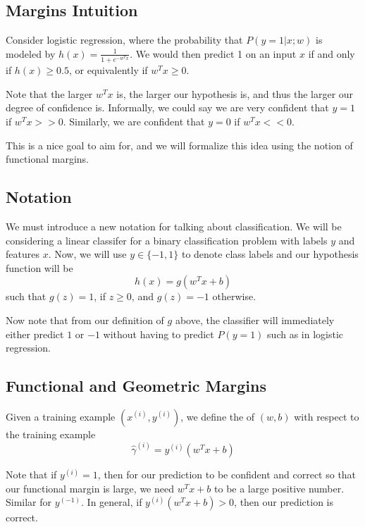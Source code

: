 \documentclass[12pt]{scrartcl}
\begin{document}
\subsection{Margins Intuition}

Consider logistic regression, where the probability that $P(y = 1 | x; w)$ is modeled by $h(x) = \frac{1}{1 + e^{-w^Tx}}$. We would then predict 1 on an input $x$ if and only if $h(x) \geq 0.5$, or equivalently if $w^Tx \geq 0$.

\begin{note}
    Note that the larger $w^Tx$ is, the larger our hypothesis is, and thus the larger our degree of confidence is. Informally, we could say we are very confident that $y = 1$ if $w^Tx >> 0$. Similarly, we are confident that $y = 0$ if $w^Tx << 0$.
\end{note}

This is a nice goal to aim for, and we will formalize this idea using the notion of functional margins.

\subsection{Notation}

We must introduce a new notation for talking about classification. We will be considering a linear classifer for a binary classification problem with labels $y$ and features $x$. Now, we will use $y \in \{-1, 1\}$ to denote class labels and our hypothesis function will be 
\[h(x) = g(w^Tx + b)\]
such that $g(z) = 1$, if $z \geq 0$, and $g(z) = -1$ otherwise.
\begin{note}
    Now note that from our definition of $g$ above, the classifier will immediately either predict $1$ or $-1$ without having to predict $P(y = 1)$ such as in logistic regression.
\end{note}

\subsection{Functional and Geometric Margins}

\begin{definition}
    Given a training example $(x^{(i)}, y^{(i)})$, we define the  of $(w,b)$ with respect to the training example 
    \[\hat \gamma^{(i)} = y^{(i)}(w^Tx + b)\]
\end{definition}

\begin{note}
    Note that if $y^{(i)} = 1$, then for our prediction to be confident and correct so that our functional margin is large, we need $w^Tx + b$ to be a large positive number. Similar for $y^{(-1)}$. In general, if $y^{(i)}(w^Tx + b) > 0$, then our prediction is correct.
\end{note}
\end{document}
